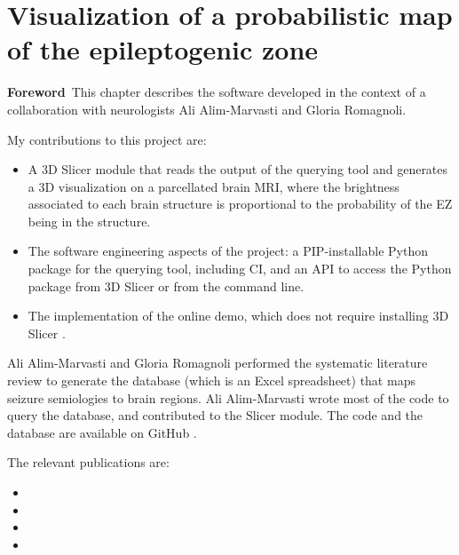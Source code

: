 \chapter[Visualization of a probabilistic map of the epileptogenic zone]{Visualization of a probabilistic map of the epileptogenic zone}

\label{chap:svt}

\minitoc


\begin{center}
  \begin{minipage}[b]{0.9\linewidth}
    \small
    \textbf{Foreword\,}
    This chapter describes the software developed in the context of a collaboration with neurologists Ali Alim-Marvasti and Gloria Romagnoli.

    My contributions to this project are:
    \begin{itemize}
      \item A 3D Slicer module \cite{fedorov_3d_2012} that reads the output of the querying tool and generates a 3D visualization on a parcellated brain \ac{MRI}, where the brightness associated to each brain structure is proportional to the probability of the \ac{EZ} being in the structure.
      \item The software engineering aspects of the project: a \ac{PIP}-installable Python package for the querying tool, including \ac{CI}, and an \ac{API} to access the Python package from 3D Slicer or from the command line.
      \item The implementation of the online demo, which does not require installing 3D Slicer%
      .
    \end{itemize}
  \end{minipage}

  \begin{minipage}[b]{0.9\linewidth}
    \small
    Ali Alim-Marvasti and Gloria Romagnoli performed the systematic literature review to generate the database (which is an Excel spreadsheet) that maps seizure semiologies to brain regions.
    Ali Alim-Marvasti wrote most of the code to query the database, and contributed to the Slicer module.
    The code and the database are available on GitHub%
    \fnurl{\svtgithub}.

    The relevant publications are:
    \begin{itemize}
      \item {}
      \item {}
      \item {}
      \item {}
    \end{itemize}

  \end{minipage}
\end{center}

\acresetall
\bodyspacing





\onehalfspacing %

